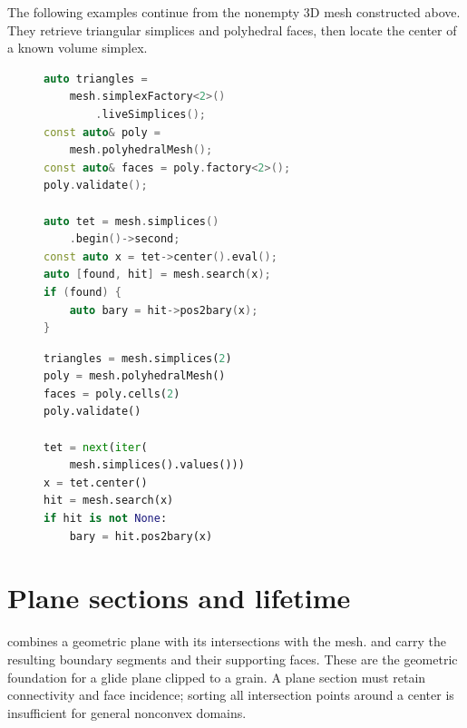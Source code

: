 The following examples continue from the nonempty 3D mesh constructed above. They retrieve triangular simplices and polyhedral faces, then locate the center of a known volume simplex.
\begin{figure}[t]
\begin{minipage}[t]{0.48\linewidth}
\begin{tcolorbox}[enhanced,colback=manualblue!5,colframe=manualblue!35,boxrule=0.4pt,
 arc=1mm,left=2mm,right=2mm,top=7mm,bottom=2mm,height=6cm,
 overlay={\node[anchor=north east,inner sep=1mm] at (frame.north east) {\cppsymbol};}]
\begin{lstlisting}[language=C++,basicstyle=\footnotesize\ttfamily,frame=none,backgroundcolor=\color{manualblue!5},aboveskip=0pt,belowskip=0pt]
auto triangles =
    mesh.simplexFactory<2>()
        .liveSimplices();
const auto& poly =
    mesh.polyhedralMesh();
const auto& faces = poly.factory<2>();
poly.validate();

auto tet = mesh.simplices()
    .begin()->second;
const auto x = tet->center().eval();
auto [found, hit] = mesh.search(x);
if (found) {
    auto bary = hit->pos2bary(x);
}
\end{lstlisting}
\end{tcolorbox}
\end{minipage}\hfill
\begin{minipage}[t]{0.48\linewidth}
\begin{tcolorbox}[enhanced,colback=Goldenrod!9,colframe=Goldenrod!55!black,boxrule=0.4pt,
 arc=1mm,left=2mm,right=2mm,top=7mm,bottom=2mm,height=6cm,
 overlay={\node[anchor=north east,inner sep=2mm] at (frame.north east) {\pythonsymbol};}]
\begin{lstlisting}[language=Python,basicstyle=\footnotesize\ttfamily,frame=none,backgroundcolor=\color{Goldenrod!9},aboveskip=0pt,belowskip=0pt]
triangles = mesh.simplices(2)
poly = mesh.polyhedralMesh()
faces = poly.cells(2)
poly.validate()

tet = next(iter(
    mesh.simplices().values()))
x = tet.center()
hit = mesh.search(x)
if hit is not None:
    bary = hit.pos2bary(x)
\end{lstlisting}
\end{tcolorbox}
\end{minipage}
\captionsetup{hypcap=false}
\end{figure}

\section{Plane sections and lifetime}
 combines a geometric plane with its intersections with the mesh.  and  carry the resulting boundary segments and their supporting faces. These are the geometric foundation for a glide plane clipped to a grain. A plane section must retain connectivity and face incidence; sorting all intersection points around a center is insufficient for general nonconvex domains.

